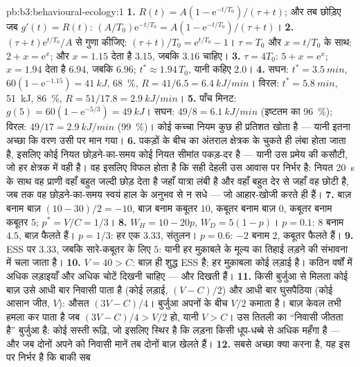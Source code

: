 \begin{solution}{pb:b3:behavioural-ecology:1}
\textbf{1.} $R(t) = A(1 - \mathrm{e}^{-t/T_{0}})/(\tau + t)$; और तब
छोड़िए जब $g'(t) = R(t)$: $(A/T_{0})\mathrm{e}^{-t/T_{0}} = A(1 - \mathrm{e}^{-t/T_{0}})/
(\tau + t)$।
\textbf{2.} $(\tau + t)\mathrm{e}^{t/T_{0}}/A$ से गुणा कीजिए: $(\tau + t)/T_{0}
= \mathrm{e}^{t/T_{0}} - 1$। $\tau = T_{0}$ और $x = t/T_{0}$ के साथ: $2 + x =
\mathrm{e}^{x}$; और $x = 1.15$ देता है $3.15$, जबकि $3.16$ चाहिए।
\textbf{3.} $\tau = 4T_{0}$: $5 + x = \mathrm{e}^{x}$; $x = 1.94$ देता है
$6.94$, जबकि $6.96$; $t^{*} \approx 1.94\,T_{0}$, यानी कहिए $2.0$।
\textbf{4.} सघन: $t^{*} = \qty{3.5}{min}$, $60(1 - \mathrm{e}^{-1.15}) =
\qty{41}{kJ}$, \qty{68}{\%}, $R = 41/6.5 = \qty{6.4}{kJ/min}$। विरल:
$t^{*} = \qty{5.8}{min}$, \qty{51}{kJ}, \qty{86}{\%}, $R = 51/17.8 =
\qty{2.9}{kJ/min}$।
\textbf{5.} पाँच मिनट: $g(5) = 60(1 - \mathrm{e}^{-5/3}) = \qty{49}{kJ}$।
सघन: $49/8 = \qty{6.1}{kJ/min}$ (इष्टतम का \qty{96}{\%}); विरल:
$49/17 = \qty{2.9}{kJ/min}$ (\qty{99}{\%})। कोई कच्चा नियम कुछ ही
प्रतिशत खोता है --- यानी इतना अच्छा कि वरण उसी पर मान गया।
\textbf{6.} पकड़ों के बीच का अंतराल क्षेत्रक के चुकते ही लंबा होता जाता
है, इसलिए कोई नियत छोड़ने-का-समय कोई नियत सीमांत पकड़-दर है --- यानी उस
प्रमेय की कसौटी, जो हर क्षेत्रक में वही है। वह इसलिए विफल होता है कि
सही देहली उस आवास पर निर्भर है: नियत \qty{20}{s} के साथ वह प्राणी वहाँ
बहुत जल्दी छोड़ देता है जहाँ यात्रा लंबी है और वहाँ बहुत देर से जहाँ वह
छोटी है, जब तक वह छोड़ने-का-समय स्वयं हाल के अनुभव से न सधे --- जो
आहार-खोजी करते ही हैं।
\textbf{7.} बाज़ बनाम बाज़ $(10 - 30)/2 = -10$, बाज़ बनाम कबूतर $10$,
कबूतर बनाम बाज़ $0$, कबूतर बनाम कबूतर $5$; $p^{*} = V/C = 1/3$।
\textbf{8.} $W_{H} = 10 - 20p$, $W_{D} = 5(1 - p)$। $p = 0.1$: $8$ बनाम
$4.5$, बाज़ फैलते हैं। $p = 1/3$: हर एक $3.33$, संतुलन। $p = 0.6$: $-2$
बनाम $2$, कबूतर फैलते हैं।
\textbf{9.} ESS पर $3.33$, जबकि सारे-कबूतर के लिए $5$: यानी हर मुक़ाबले
के मूल्य का तिहाई लड़ने की संभावना में चला जाता है।
\textbf{10.} $V = 40 > C$: बाज़ ही शुद्ध ESS है; हर मुक़ाबला कोई लड़ाई
है। कठिन वर्षों में अधिक लड़ाइयाँ और अधिक चोटें दिखनी चाहिए --- और
दिखती हैं।
\textbf{11.} किसी बुर्जुआ से मिलता कोई बाज़ उसे आधी बार निवासी पाता है
(कोई लड़ाई, $(V - C)/2$) और आधी बार घुसपैठिया (कोई आसान जीत, $V$):
औसत $(3V - C)/4$। बुर्जुआ अपनों के बीच $V/2$ कमाता है। बाज़ केवल तभी
हमला कर पाता है जब $(3V - C)/4 > V/2$ हो, यानी $V > C$। उस तितली का
``निवासी जीतता है'' बुर्जुआ है: कोई सस्ती रूढ़ि, जो इसलिए स्थिर है कि
लड़ना किसी धूप-धब्बे से अधिक महँगा है --- और जब दोनों अपने को निवासी
मानें तब दोनों बाज़ खेलते हैं।
\textbf{12.} सबसे अच्छा क्या करना है, यह इस पर निर्भर है कि बाकी सब

\end{solution}
